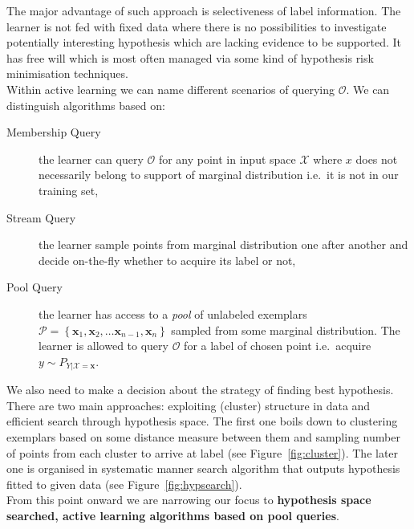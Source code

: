 \documentclass[12pt, a4paper, pdflatex]{report}
\begin{document}
The major advantage of such approach is selectiveness of label information. The learner is not fed with fixed data where there is no possibilities to investigate potentially interesting hypothesis which are lacking evidence to be supported. It has free will which is most often managed via some kind of hypothesis risk minimisation techniques.\\

Within active learning we can name different scenarios of querying $\mathscr{O}$. We can distinguish algorithms based on:
\begin{description}
\item[Membership Query] the learner can query $\mathscr{O}$ for any point in input space $\mathscr{X}$ where $x$ does not necessarily belong to support of marginal distribution i.e.\ it is not in our training set,
\item[Stream Query] the learner sample points from marginal distribution one after another and decide on-the-fly whether to acquire its label or not,
\item[Pool Query] the learner has access to a \emph{pool} of unlabeled exemplars $\mathscr{P} = \left\{ \mathbf{x}_1, \mathbf{x}_2, \dots \mathbf{x}_{n-1}, \mathbf{x}_n \right\}$ sampled from some marginal distribution. The learner is allowed to query $\mathscr{O}$ for a label of chosen point i.e.\ acquire $y \sim P_{Y|\mathscr{X} = \mathbf{x}}$.\\
\end{description}

We also need to make a decision about the strategy of finding best hypothesis. There are two main approaches: exploiting (cluster) structure in data and efficient search through hypothesis space. The first one boils down to clustering exemplars based on some distance measure between them and sampling number of points from each cluster to arrive at label (see Figure~\ref{fig:cluster}). The later one is organised in systematic manner search algorithm that outputs hypothesis fitted to given data (see Figure~\ref{fig:hypsearch}).\\

From this point onward we are narrowing our focus to \textbf{hypothesis space searched, active learning algorithms based on pool queries}.\\
\end{document}
